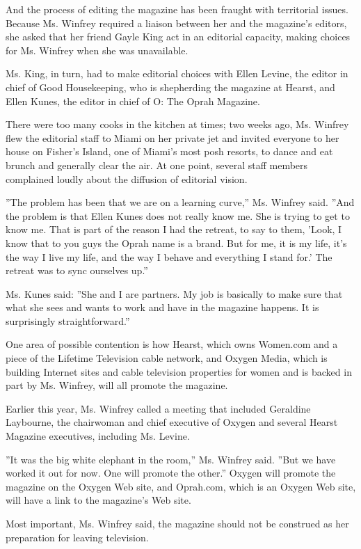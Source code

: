 And the process of editing the magazine has been fraught with
territorial issues. Because Ms. Winfrey required a liaison between her
and the magazine's editors, she asked that her friend Gayle King act in
an editorial capacity, making choices for Ms. Winfrey when she was
unavailable.

Ms. King, in turn, had to make editorial choices with Ellen Levine, the
editor in chief of Good Housekeeping, who is shepherding the magazine at
Hearst, and Ellen Kunes, the editor in chief of O: The Oprah Magazine.

There were too many cooks in the kitchen at times; two weeks ago, Ms.
Winfrey flew the editorial staff to Miami on her private jet and invited
everyone to her house on Fisher's Island, one of Miami's most posh
resorts, to dance and eat brunch and generally clear the air. At one
point, several staff members complained loudly about the diffusion of
editorial vision.

''The problem has been that we are on a learning curve,'' Ms. Winfrey
said. ''And the problem is that Ellen Kunes does not really know me. She
is trying to get to know me. That is part of the reason I had the
retreat, to say to them, 'Look, I know that to you guys the Oprah name
is a brand. But for me, it is my life, it's the way I live my life, and
the way I behave and everything I stand for.' The retreat was to sync
ourselves up.''

Ms. Kunes said: ''She and I are partners. My job is basically to make
sure that what she sees and wants to work and have in the magazine
happens. It is surprisingly straightforward.''

One area of possible contention is how Hearst, which owns Women.com and
a piece of the Lifetime Television cable network, and Oxygen Media,
which is building Internet sites and cable television properties for
women and is backed in part by Ms. Winfrey, will all promote the
magazine.

Earlier this year, Ms. Winfrey called a meeting that included Geraldine
Laybourne, the chairwoman and chief executive of Oxygen and several
Hearst Magazine executives, including Ms. Levine.

''It was the big white elephant in the room,'' Ms. Winfrey said. ''But
we have worked it out for now. One will promote the other.'' Oxygen will
promote the magazine on the Oxygen Web site, and Oprah.com, which is an
Oxygen Web site, will have a link to the magazine's Web site.

Most important, Ms. Winfrey said, the magazine should not be construed
as her preparation for leaving television.

